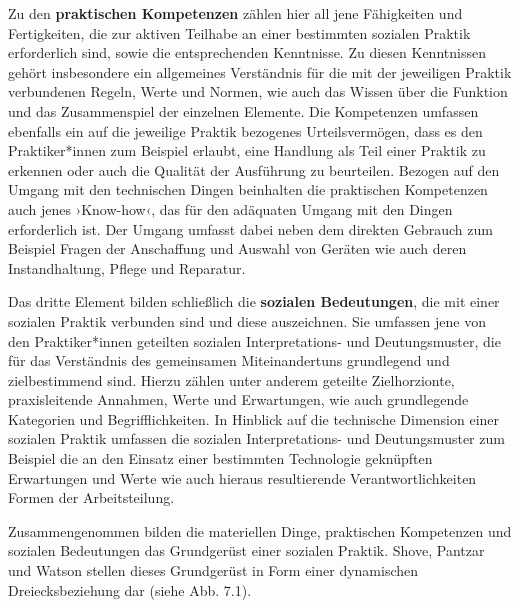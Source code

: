 \documentclass[
  a4paper,
]{book}
\begin{document}
Zu den \textbf{praktischen Kompetenzen} zählen hier all jene Fähigkeiten und Fertigkeiten, die zur aktiven Teilhabe an einer bestimmten sozialen Praktik erforderlich sind, sowie die entsprechenden Kenntnisse. Zu diesen Kenntnissen gehört insbesondere ein allgemeines Verständnis für die mit der jeweiligen Praktik verbundenen Regeln, Werte und Normen, wie auch das Wissen über die Funktion und das Zusammenspiel der einzelnen Elemente. Die Kompetenzen umfassen ebenfalls ein auf die jeweilige Praktik bezogenes Urteilsvermögen, dass es den Praktiker*innen zum Beispiel erlaubt, eine Handlung als Teil einer Praktik zu erkennen oder auch die Qualität der Ausführung zu beurteilen. Bezogen auf den Umgang mit den technischen Dingen beinhalten die praktischen Kompetenzen auch jenes ›Know-how‹, das für den adäquaten Umgang mit den Dingen erforderlich ist. Der Umgang umfasst dabei neben dem direkten Gebrauch zum Beispiel Fragen der Anschaffung und Auswahl von Geräten wie auch deren Instandhaltung, Pflege und Reparatur.

Das dritte Element bilden schließlich die \textbf{sozialen Bedeutungen}, die mit einer sozialen Praktik verbunden sind und diese auszeichnen. Sie umfassen jene von den Praktiker*innen geteilten sozialen Interpretations- und Deutungsmuster, die für das Verständnis des gemeinsamen Miteinandertuns grundlegend und zielbestimmend sind. Hierzu zählen unter anderem geteilte Zielhorzionte, praxisleitende Annahmen, Werte und Erwartungen, wie auch grundlegende Kategorien und Begrifflichkeiten. In Hinblick auf die technische Dimension einer sozialen Praktik umfassen die sozialen Interpretations- und Deutungsmuster zum Beispiel die an den Einsatz einer bestimmten Technologie geknüpften Erwartungen und Werte wie auch hieraus resultierende Verantwortlichkeiten Formen der Arbeitsteilung.

Zusammengenommen bilden die materiellen Dinge, praktischen Kompetenzen und sozialen Bedeutungen das Grundgerüst einer sozialen Praktik. Shove, Pantzar und Watson stellen dieses Grundgerüst in Form einer dynamischen Dreiecksbeziehung dar (siehe {Abb. 7.1}).
\end{document}
